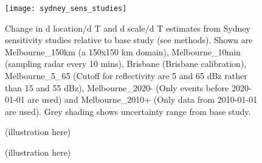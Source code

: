 \documentclass{ametsocV5}
\begin{document}
\begin{figure}
    \centering
    \texttt{[image: sydney\_sens\_studies]}
    \caption{Change in d location/d T and d scale/d T estimates from  Sydney sensitivity studies relative to base study (see methods). Shown are Melbourne\_150km (a 150x150 km domain), Melbourne\_10min (sampling radar every 10 mins), Brisbane (Brisbane calibration), Melbourne\_5\_65 (Cutoff for reflectivity are 5 and 65 dBz rather than 15 and 55 dBz), Melbourne\_2020- (Only events  before  2020-01-01 are used) and  Melbourne\_2010+ (Only data from 2010-01-01 are used). Grey shading shows uncertainty range from base study. }
    \label{fig:sydney_sens_studies}
\end{figure}



\begin{figure}
\centerline{(illustration here)}
\end{figure}

\begin{figure}
\centerline{(illustration here)}
\end{figure}
\end{document}
